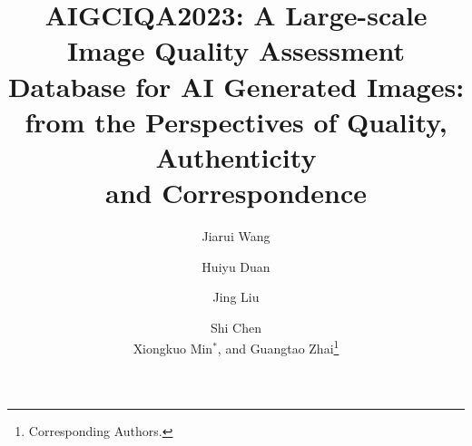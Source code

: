\documentclass[runningheads]{llncs}
\begin{document}
%





\title{AIGCIQA2023:  A Large-scale Image Quality Assessment Database for AI Generated Images: from the Perspectives of Quality, Authenticity \\ and Correspondence}
%
\author{Jiarui Wang\and
Huiyu Duan\and
Jing Liu\and
Shi Chen\\
Xiongkuo Min$^*$, and Guangtao Zhai\thanks{Corresponding Authors.}
}

\end{document}
